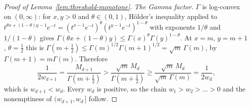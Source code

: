 \begin{proof}[Proof of Lemma~\ref{lem:threshold-monotone}]
\emph{The Gamma factor.} $\Gamma$ is log-convex on $(0,\infty)$: for $x,y > 0$ and
$\theta \in (0,1)$, H\"older's inequality applied to
$t^{\theta x + (1-\theta)y - 1}e^{-t} = (t^{x-1}e^{-t})^\theta (t^{y-1}e^{-t})^{1-\theta}$ with
exponents $1/\theta$ and $1/(1-\theta)$ gives
$\Gamma(\theta x + (1-\theta)y) \le \Gamma(x)^\theta\Gamma(y)^{1-\theta}$. At
$x = m$, $y = m+1$, $\theta = \tfrac12$ this is
$\Gamma(m + \tfrac12) \le \Gamma(m)^{1/2}\Gamma(m+1)^{1/2} = \sqrt{m}\,\Gamma(m)$, by
$\Gamma(m+1) = m\Gamma(m)$. Therefore
\[
  \frac{1}{2w_{d+1}} = \frac{M_{d+1}}{\Gamma(m + \frac12)}
   > \frac{\sqrt m\,M_d}{\Gamma(m+\frac12)}
   \ge \frac{\sqrt m\,M_d}{\sqrt m\,\Gamma(m)} = \frac{1}{2w_d} ,
\]
which is $w_{d+1} < w_d$. Every $w_d$ is positive, so the chain $w_1 > w_2 > \dots > 0$ and the
nonemptiness of $(w_{d+1},w_d\,]$ follow.
\end{proof}

